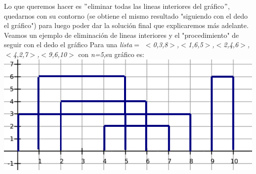 \documentclass{article}
\begin{document}
Lo que queremos hacer es $"$eliminar todas las lineas interiores del gr\'afico$"$, quedarnos con su contorno (se obtiene el mismo resultado  "siguiendo con el dedo el gr\'afico") para luego poder dar la solución final que explicaremos más adelante. \newpage
Veamos un ejemplo de eliminación de lineas interiores y el "procedimiento" de seguir con el dedo el gráfico \newline
Para una \textit{lista$=$ $<$0,3,8$>$,$<$1,6,5$>$,$<$2,4,6$>$,$<$4,2,7$>$,$<$9,6,10$>$} con \textit{n=5},\newline su gr\'afico es: \newline
\includegraphics[width=\textwidth,height=\textheight,keepaspectratio
]{edificiosGraf2.png}
\begin {flushleft}
\end{flushleft}
\end{document}
